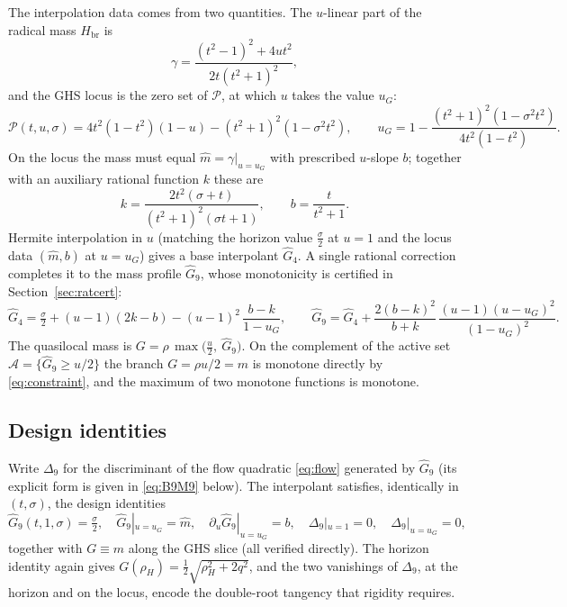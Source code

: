 \documentclass[11pt]{article}
\theoremstyle{plain}
\theoremstyle{definition}
\newcommand{\rH}{\rho_{\!H}}
\newcommand{\Hbr}{H_{\mathrm{br}}}
\begin{document}
The interpolation data comes from two quantities. The $u$-linear part of the radical mass $\Hbr$ is
\begin{equation*}
   \gamma=\frac{(t^2-1)^2+4ut^2}{2t(t^2+1)^2},
\end{equation*}
and the GHS locus is the zero set of $\mathcal P$, at which $u$ takes the value $u_G$:
\begin{equation*}
   \mathcal P(t,u,\sigma)=4t^2(1-t^2)(1-u)-(t^2+1)^2(1-\sigma^2t^2),\qquad
   u_G=1-\frac{(t^2+1)^2(1-\sigma^2t^2)}{4t^2(1-t^2)}.
\end{equation*}
On the locus the mass must equal $\widehat m=\gamma|_{u=u_G}$ with prescribed $u$-slope $b$; together with an
auxiliary rational function $k$ these are
\begin{equation*}
   k=\frac{2t^2(\sigma+t)}{(t^2+1)^2(\sigma t+1)},\qquad b=\frac{t}{t^2+1}.
\end{equation*}
Hermite interpolation in $u$ (matching the horizon value $\tfrac\sigma2$ at $u=1$ and the locus data
$(\widehat m,b)$ at $u=u_G$) gives a base interpolant $\widehat G_4$. A single rational correction completes it
to the mass profile $\widehat G_9$, whose monotonicity is certified in Section~\ref{sec:ratcert}:
\begin{equation*}
   \widehat G_4=\tfrac\sigma2+(u-1)(2k-b)-(u-1)^2\,\frac{b-k}{1-u_G},\qquad
   \widehat G_9=\widehat G_4+\frac{2(b-k)^2}{b+k}\,\frac{(u-1)(u-u_G)^2}{(1-u_G)^2}.
\end{equation*}
The quasilocal mass is $G=\rho\,\max\!\big(\tfrac u2,\ \widehat G_9\big)$. On the complement of the active set
$\mathcal A=\{\widehat G_9\ge u/2\}$ the branch $G=\rho u/2=m$ is monotone directly by \eqref{eq:constraint},
and the maximum of two monotone functions is monotone.

\subsection{Design identities}\label{sec:ratid}

Write $\Delta_9$ for the discriminant of the flow quadratic \eqref{eq:flow} generated by $\widehat G_9$ (its
explicit form is given in \eqref{eq:B9M9} below). The interpolant satisfies, identically in $(t,\sigma)$, the
design identities
\begin{equation*}
   \widehat G_9(t,1,\sigma)=\tfrac\sigma2,\quad \widehat G_9|_{u=u_G}=\widehat m,\quad
   \partial_u\widehat G_9|_{u=u_G}=b,\quad \Delta_9|_{u=1}=0,\quad \Delta_9|_{u=u_G}=0,
\end{equation*}
together with $G\equiv m$ along the GHS slice (all verified directly). The horizon
identity again gives $G(\rH)=\tfrac12\sqrt{\rH^2+2q^2}$, and the two vanishings of $\Delta_9$, at the horizon and
on the locus, encode the double-root tangency that rigidity requires.
\end{document}
